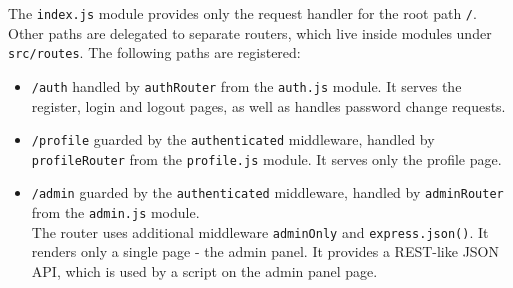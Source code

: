 The \texttt{index.js} module provides only the request handler for the root path \texttt{/}. Other paths are delegated to separate routers, which live inside modules under \texttt{src/routes}. The following paths are registered:

\begin{itemize}
    \item \texttt{/auth} handled by \texttt{authRouter} from the \texttt{auth.js} module. It serves the register, login and logout pages, as well as handles password change requests.
    \item \texttt{/profile} guarded by the \texttt{authenticated} middleware, handled by \texttt{profileRouter} from the \texttt{profile.js} module. It serves only the profile page.
    \item \texttt{/admin} guarded by the \texttt{authenticated} middleware, handled by \texttt{adminRouter} from the \texttt{admin.js} module.\\
    The router uses additional middleware \texttt{adminOnly} and \texttt{express.json()}. It renders only a single page - the admin panel. It provides a REST-like JSON API, which is used by a script on the admin panel page.
\end{itemize}
